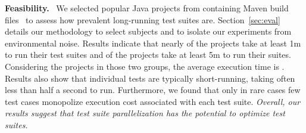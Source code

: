 



\vspace{1ex}\noindent\textbf{Feasibility.}~
We selected \numSubjs{} popular Java projects from \github{}
containing Maven build files~\cite{maven} to assess how prevalent
long-running test suites are.  Section~\ref{sec:eval} details our
methodology to select subjects and to isolate our experiments from
environmental noise.  Results indicate that nearly
\percentMedLongRunning{} of the projects take at least 1m to run their
test suites and \percentLongRunning{} of the projects take at least 5m
to run their suites.  Considering the \numMedLong{} projects in those
two groups, the average execution time is \averageMedLongRunning{}.
Results also show that individual tests are typically short-running,
taking often less than half a second to run.  Furthermore, we found
that only in rare cases few test cases monopolize execution cost
associated with each test suite.  \emph{Overall, our results suggest
  that test suite parallelization has the potential to optimize test
  suites.}


